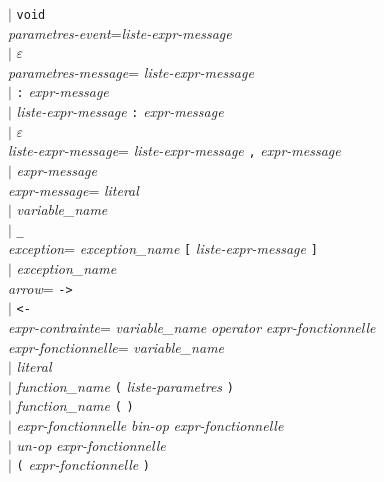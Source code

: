 \begin{tabbing}
    \>$\mid$\> \texttt{void}\\ 




\emph{parametres-event}\>\twocol=\>\emph{liste-expr-message}\\
    \>$\mid$\> $\varepsilon$\\

\emph{parametres-message}\>\twocol=\>  \emph{liste-expr-message} \\
    \>$\mid$\> \texttt{:} \emph{expr-message} \\
    \>$\mid$\> \emph{liste-expr-message} \texttt{:} \emph{expr-message} \\
    \>$\mid$\> $\varepsilon$\\

\emph{liste-expr-message}\>\twocol=\>  \emph{liste-expr-message} \texttt{,} \emph{expr-message}\\
    \>$\mid$\> \emph{expr-message} \\

\emph{expr-message}\>\twocol=\> \emph{literal} \\
    \>$\mid$\> \emph{variable\_name}\\
    \>$\mid$\> \verb+_+\\

\emph{exception}\>\twocol=\> \emph{exception\_name} \texttt{[} \emph{liste-expr-message} \texttt{]}\\
    \>$\mid$\>  \emph{exception\_name}\\

\emph{arrow}\>\twocol=\>  \verb+->+ \\
\>$\mid$\> \verb+<-+ \\

\emph{expr-contrainte}\>\twocol=\> \emph{variable\_name} \emph{operator} \emph{expr-fonctionnelle}\\

\emph{expr-fonctionnelle}\>\twocol=\> \emph{variable\_name}  \\
    \>$\mid$\> \emph{literal}  \\
    \>$\mid$\> \emph{function\_name} \texttt{(} \emph{liste-parametres} \texttt{)} \\
    \>$\mid$\> \emph{function\_name} \texttt{(} \texttt{)} \\
    \>$\mid$\> \emph{expr-fonctionnelle} \emph{bin-op}
    \emph{expr-fonctionnelle}\\
    \>$\mid$\> \emph{un-op}  \emph{expr-fonctionnelle}\\
    \>$\mid$\> \texttt{(} \emph{expr-fonctionnelle} \texttt{)} \\


\end{tabbing}
